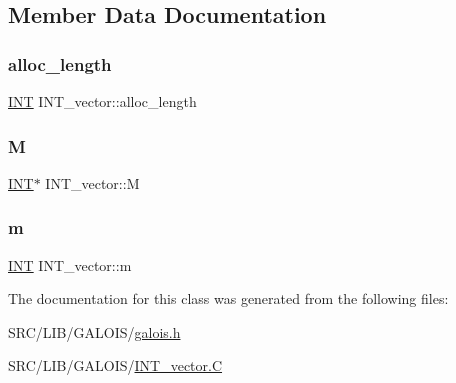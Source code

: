 \subsection{Member Data Documentation}
\mbox{\label{class_i_n_t__vector_ade027034d125bc7a714175a41e518c90}} 
\subsubsection{\texorpdfstring{alloc\+\_\+length}{alloc\_length}}
{\footnotesize\ttfamily \mbox{\hyperlink{galois_8h_a09fddde158a3a20bd2dcadb609de11dc}{I\+NT}} I\+N\+T\+\_\+vector\+::alloc\+\_\+length}

\mbox{\label{class_i_n_t__vector_a7dd0dba739fad21b7b6ea4b214b38846}} 
\subsubsection{\texorpdfstring{M}{M}}
{\footnotesize\ttfamily \mbox{\hyperlink{galois_8h_a09fddde158a3a20bd2dcadb609de11dc}{I\+NT}}$\ast$ I\+N\+T\+\_\+vector\+::M}

\mbox{\label{class_i_n_t__vector_a097fdc0fae16f103ddb6b57d89203334}} 
\subsubsection{\texorpdfstring{m}{m}}
{\footnotesize\ttfamily \mbox{\hyperlink{galois_8h_a09fddde158a3a20bd2dcadb609de11dc}{I\+NT}} I\+N\+T\+\_\+vector\+::m}



The documentation for this class was generated from the following files\+:\begin{DoxyCompactItemize}
\item 
S\+R\+C/\+L\+I\+B/\+G\+A\+L\+O\+I\+S/\mbox{\hyperlink{galois_8h}{galois.\+h}}\item 
S\+R\+C/\+L\+I\+B/\+G\+A\+L\+O\+I\+S/\mbox{\hyperlink{_i_n_t__vector_8_c}{I\+N\+T\+\_\+vector.\+C}}\end{DoxyCompactItemize}
